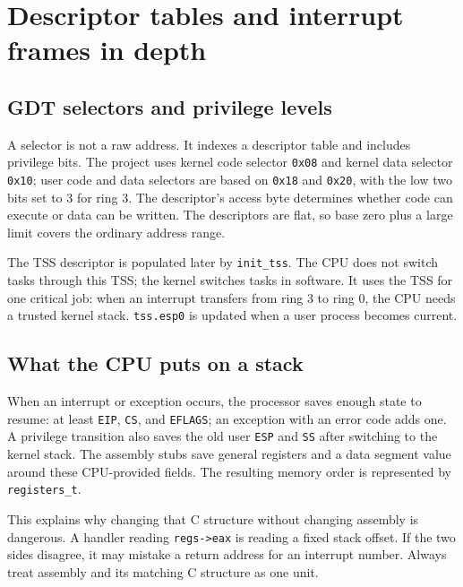 
\chapter{Descriptor tables and interrupt frames in depth}
\section{GDT selectors and privilege levels}
A selector is not a raw address. It indexes a descriptor table and includes privilege bits. The project uses kernel code selector \texttt{0x08} and kernel data selector \texttt{0x10}; user code and data selectors are based on \texttt{0x18} and \texttt{0x20}, with the low two bits set to 3 for ring 3. The descriptor's access byte determines whether code can execute or data can be written. The descriptors are flat, so base zero plus a large limit covers the ordinary address range.

The TSS descriptor is populated later by \texttt{init\_tss}. The CPU does not switch tasks through this TSS; the kernel switches tasks in software. It uses the TSS for one critical job: when an interrupt transfers from ring 3 to ring 0, the CPU needs a trusted kernel stack. \texttt{tss.esp0} is updated when a user process becomes current.

\section{What the CPU puts on a stack}
When an interrupt or exception occurs, the processor saves enough state to resume: at least \texttt{EIP}, \texttt{CS}, and \texttt{EFLAGS}; an exception with an error code adds one. A privilege transition also saves the old user \texttt{ESP} and \texttt{SS} after switching to the kernel stack. The assembly stubs save general registers and a data segment value around these CPU-provided fields. The resulting memory order is represented by \texttt{registers\_t}.

This explains why changing that C structure without changing assembly is dangerous. A handler reading \texttt{regs->eax} is reading a fixed stack offset. If the two sides disagree, it may mistake a return address for an interrupt number. Always treat assembly and its matching C structure as one unit.

